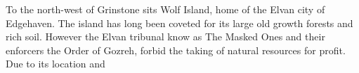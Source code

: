 To the north-west of Grinstone sits Wolf Island, home of the Elvan city of 
Edgehaven. The island has long been coveted for its large old growth forests and 
rich soil.  However the Elvan tribunal know as The Masked Ones and their enforcers
the Order of Gozreh, forbid the taking of natural resources for profit.  Due to
its location and  
